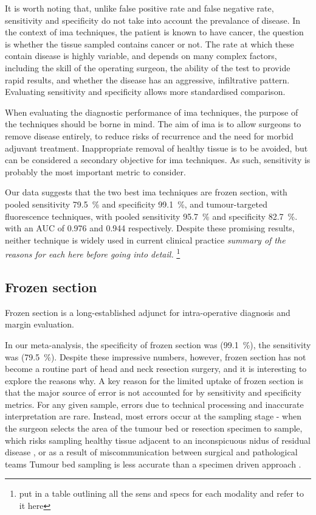 It is worth noting that, unlike false positive rate and false negative rate, sensitivity and specificity do not take into account the prevalance of disease. 
In the context of \gls{ima} techniques, the patient is known to have cancer, the question is whether the tissue sampled contains cancer or not. 
The rate at which these contain disease is highly variable, and depends on many complex factors, including the skill of the operating surgeon, the ability of the test to provide rapid results, and whether the disease has an aggressive, infiltrative pattern.
Evaluating sensitivity and specificity allows more standardised comparison.

When evaluating the diagnostic performance of \gls{ima} techniques, the purpose of the techniques should be borne in mind. 
The aim of \gls{ima} is to allow surgeons to remove disease entirely, to reduce risks of recurrence and the need for morbid adjuvant treatment.
Inappropriate removal of healthy tissue is to be avoided, but can be considered a secondary objective for \gls{ima} techniques.
As such, sensitivity is probably the most important metric to consider.

Our data suggests that the two best \gls{ima} techniques are frozen section, with pooled sensitivity \SI{79.5}{\percent} and specificity \SI{99.1}{\percent}, and tumour-targeted fluorescence techniques, with pooled sensitivity \SI{95.7}{\percent} and specificity \SI{82.7}{\percent}.
with an AUC of 0.976 and 0.944 respectively.
Despite these promising results, neither technique is widely used in current clinical practice
\emph{summary of the reasons for each here before going into detail.}
\footnote{put in a table outlining all the sens and specs for each modality and refer to it here}

\subsection{Frozen section}

Frozen section is a long-established adjunct for intra-operative diagnosis and margin evaluation.

In our meta-analysis, the specificity of frozen section was (\SI{99.1}{\percent}), the sensitivity was (\SI{79.5}{\percent}).
Despite these impressive numbers, however, frozen section has not become a routine part of head and neck resection surgery, and it is interesting to explore the reasons why.
A key reason for the limited uptake of frozen section is that the major source of error is not accounted for by sensitivity and specificity metrics.
For any given sample, errors due to technical processing and inaccurate interpretation are rare.
Instead, most errors occur at the sampling stage - when the surgeon selects the area of the tumour bed or resection specimen to sample\cite{layfieldFrozenSectionEvaluation2018}, which risks sampling healthy tissue adjacent to an inconspicuous nidus of residual disease \cite{due.RefiningUtilityRole2016}, or as a result of miscommunication between surgical and pathological teams \cite{blackc.CriticalEvaluationFrozen2006}
Tumour bed sampling is less accurate than a specimen driven approach \cite{maxwellEarlyOralTongue2015}.

